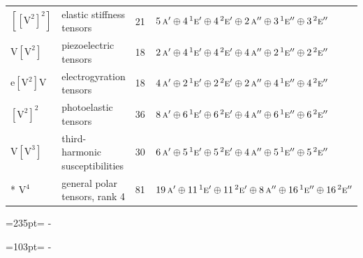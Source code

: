 \documentclass[10pt,a4paper]{article}
\newcommand{\needspace}[1]{\par\penalty-100\begingroup\dimen0=#1\relax\dimen2=\pagegoal
  \advance\dimen2-\pagetotal\ifdim\dimen0>\dimen2\relax\ifdim\dimen2>0pt\vfil\break\fi\fi
  \endgroup}
\numberwithin{equation}{section}
\newcommand{\irr}[1]{\text{\normalfont\scshape #1}}
\newcommand{\conjpair}[1]{{}^{#1}}
\newcommand{\jahn}[1]{\mathrm{#1}}
\newlength{\fillwidth}\newlength{\cellwidth}\newlength{\colwidth}
\begin{document}
{\begin{longtable}{@{}llr>{\RaggedRight\arraybackslash}p{\fillwidth}@{}}
$\jahn{[[V^{2}]^{2}]}$ & elastic stiffness tensors & 21 & $5\,\irr{a}' \oplus\allowbreak 4\,\conjpair{1}\irr{e}' \oplus\allowbreak 4\,\conjpair{2}\irr{e}' \oplus\allowbreak 2\,\irr{a}'' \oplus\allowbreak 3\,\conjpair{1}\irr{e}'' \oplus\allowbreak 3\,\conjpair{2}\irr{e}''$\\
$\jahn{V[V^{2}]}$ & piezoelectric tensors & 18 & $2\,\irr{a}' \oplus\allowbreak 4\,\conjpair{1}\irr{e}' \oplus\allowbreak 4\,\conjpair{2}\irr{e}' \oplus\allowbreak 4\,\irr{a}'' \oplus\allowbreak 2\,\conjpair{1}\irr{e}'' \oplus\allowbreak 2\,\conjpair{2}\irr{e}''$\\
$\jahn{e[V^{2}]V}$ & electrogyration tensors & 18 & $4\,\irr{a}' \oplus\allowbreak 2\,\conjpair{1}\irr{e}' \oplus\allowbreak 2\,\conjpair{2}\irr{e}' \oplus\allowbreak 2\,\irr{a}'' \oplus\allowbreak 4\,\conjpair{1}\irr{e}'' \oplus\allowbreak 4\,\conjpair{2}\irr{e}''$\\
$\jahn{[V^{2}]^{2}}$ & photoelastic tensors & 36 & $8\,\irr{a}' \oplus\allowbreak 6\,\conjpair{1}\irr{e}' \oplus\allowbreak 6\,\conjpair{2}\irr{e}' \oplus\allowbreak 4\,\irr{a}'' \oplus\allowbreak 6\,\conjpair{1}\irr{e}'' \oplus\allowbreak 6\,\conjpair{2}\irr{e}''$\\
$\jahn{V[V^{3}]}$ & third-harmonic susceptibilities & 30 & $6\,\irr{a}' \oplus\allowbreak 5\,\conjpair{1}\irr{e}' \oplus\allowbreak 5\,\conjpair{2}\irr{e}' \oplus\allowbreak 4\,\irr{a}'' \oplus\allowbreak 5\,\conjpair{1}\irr{e}'' \oplus\allowbreak 5\,\conjpair{2}\irr{e}''$\\*
$\jahn{V^{4}}$ & general polar tensors, rank 4 & 81 & $19\,\irr{a}' \oplus\allowbreak 11\,\conjpair{1}\irr{e}' \oplus\allowbreak 11\,\conjpair{2}\irr{e}' \oplus\allowbreak 8\,\irr{a}'' \oplus\allowbreak 16\,\conjpair{1}\irr{e}'' \oplus\allowbreak 16\,\conjpair{2}\irr{e}''$\\
\bottomrule\end{longtable}}
\needspace{235pt}
\needspace{103pt}
\end{document}
